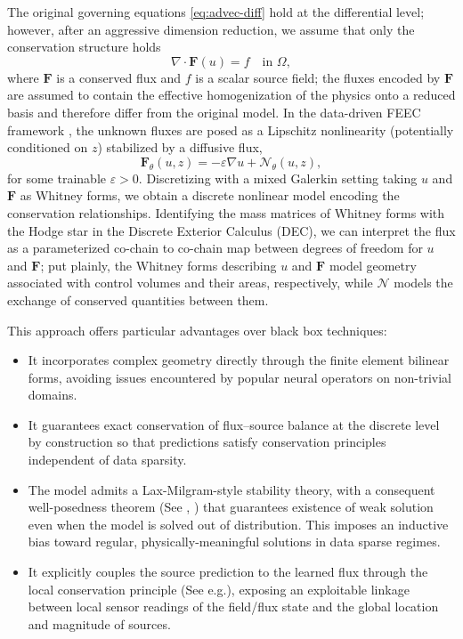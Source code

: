 \documentclass[onefignum,onetabnum]{siamart171218} %
\begin{document}
The original governing equations \eqref{eq:advec-diff} hold at the differential level; however, after an aggressive dimension reduction, we assume that only the conservation structure holds
\begin{equation}
    \label{eq:conservation}
    \nabla \cdot \mathbf{F}(u) = f \quad \text{in } \Omega,
\end{equation}
where \( \mathbf{F} \) is a conserved flux and \( f \) is a scalar source field; the fluxes encoded by $\mathbf{F}$ are assumed to contain the effective homogenization of the physics onto a reduced basis and therefore differ from the original model. In the data-driven FEEC framework \cite{kinch2025structure, actor2024data, trask2022enforcing}, the unknown fluxes are posed as a Lipschitz nonlinearity (potentially conditioned on $z$) stabilized by a diffusive flux, 
\begin{equation}
    \mathbf{F}_\theta(u, z) = -\varepsilon \nabla u + \mathcal{N}_\theta(u, z),
\end{equation}
for some trainable \( \varepsilon > 0 \). Discretizing with a mixed Galerkin setting taking $u$ and $\mathbf{F}$ as Whitney forms, we obtain a discrete nonlinear model encoding the conservation relationships. Identifying the mass matrices of Whitney forms with the Hodge star in the Discrete Exterior Calculus (DEC), we can interpret the flux as a parameterized co-chain to co-chain map between degrees of freedom for $u$ and $\mathbf{F}$; put plainly, the Whitney forms describing $u$ and $\mathbf{F}$ model geometry associated with control volumes and their areas, respectively, while $\mathcal{N}$ models the exchange of conserved quantities between them.

This approach offers particular advantages over black box techniques:
\begin{itemize}[leftmargin=*]
    \item It incorporates complex geometry directly through the finite element bilinear forms, avoiding issues encountered by popular neural operators on non-trivial domains.
    \item It guarantees exact conservation of flux–source balance at the discrete level by construction so that predictions satisfy conservation principles independent of data sparsity.
    \item The model admits a Lax-Milgram-style stability theory, with a consequent well-posedness theorem (See \cite[Thm. 2.1]{kinch2025structure}, \cite[Thms. 3.1-5]{trask2022enforcing}) that guarantees existence of weak solution even when the model is solved out of distribution. This imposes an inductive bias toward regular, physically-meaningful solutions in data sparse regimes. 
    \item It explicitly couples the source prediction to the learned flux through the local conservation principle (See e.g.\cite[Sec. 3]{trask2022enforcing}), exposing an exploitable linkage between local sensor readings of the field/flux state and the global location and magnitude of sources.
\end{itemize}
\end{document}
